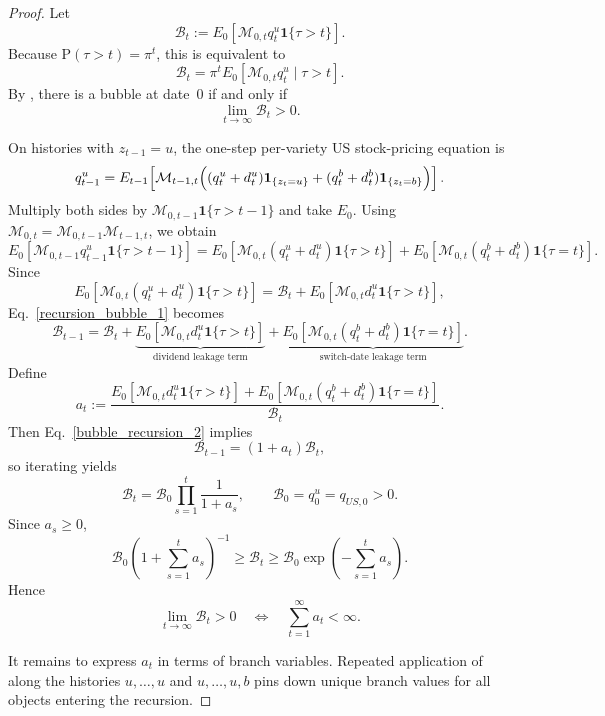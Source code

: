\documentclass{article}
\begin{document}
\begin{proof}
Let
\[
\mathcal B_t
:=
E_0\!\left[\mathcal M_{0,t}q_t^u\mathbf 1\{\tau>t\}\right].
\]
Because $\mathrm{P}(\tau>t)=\pi^t$, this is equivalent to
\[
\mathcal B_t
=
\pi^t E_0\!\left[\mathcal M_{0,t}q_t^u\mid \tau>t\right].
\]
By , there is a bubble at date~0 if and only if
\[
\lim_{t\to\infty}\mathcal B_t>0.
\]

On histories with $z_{t-1}=u$, the one-step per-variety US stock-pricing equation is
\[
q_{t-1}^u
=
E_{t-1}\!\left[\mathcal M_{t-1,t}
\Bigl(
(q_t^u+d_t^u)\mathbf 1_{\{z_t=u\}}
+
(q_t^b+d_t^b)\mathbf 1_{\{z_t=b\}}
\Bigr)\right].
\]
Multiply both sides by $\mathcal M_{0,t-1}\mathbf 1\{\tau>t-1\}$ and take $E_0$. Using $\mathcal M_{0,t}=\mathcal M_{0,t-1}\mathcal M_{t-1,t}$, we obtain
\begin{equation}\label{recursion_bubble_1}
E_0\!\left[\mathcal M_{0,t-1}q_{t-1}^u\mathbf 1\{\tau>t-1\}\right]
=
E_0\!\left[\mathcal M_{0,t}(q_t^u+d_t^u)\mathbf 1\{\tau>t\}\right]
+
E_0\!\left[\mathcal M_{0,t}(q_t^b+d_t^b)\mathbf 1\{\tau=t\}\right].
\end{equation}
Since
\[
E_0\!\left[\mathcal M_{0,t}(q_t^u+d_t^u)\mathbf 1\{\tau>t\}\right]
=
\mathcal B_t
+
E_0\!\left[\mathcal M_{0,t}d_t^u\mathbf 1\{\tau>t\}\right],
\]
Eq.~\eqref{recursion_bubble_1} becomes
\begin{equation}\label{bubble_recursion_2}
\mathcal B_{t-1}
=
\mathcal B_t
+
\underbrace{E_0\!\left[\mathcal M_{0,t}d_t^u\mathbf 1\{\tau>t\}\right]}_{\text{dividend leakage term}}
+
\underbrace{E_0\!\left[\mathcal M_{0,t}(q_t^b+d_t^b)\mathbf 1\{\tau=t\}\right]}_{\text{switch-date leakage term}}.
\end{equation}
Define
\[
a_t
:=
\frac{
E_0\!\left[\mathcal M_{0,t}d_t^u\mathbf 1\{\tau>t\}\right]
+
E_0\!\left[\mathcal M_{0,t}(q_t^b+d_t^b)\mathbf 1\{\tau=t\}\right]
}{
\mathcal B_t
}.
\]
Then Eq.~\eqref{bubble_recursion_2} implies
\[
\mathcal B_{t-1}=(1+a_t)\mathcal B_t,
\]
so iterating yields
\[
\mathcal B_t
=
\mathcal B_0\prod_{s=1}^t\frac{1}{1+a_s},
\qquad
\mathcal B_0=q_0^u=q_{US,0}>0.
\]
Since $a_s\ge 0$,
\[
\mathcal B_0\left(1+\sum_{s=1}^t a_s\right)^{-1}
\ge
\mathcal B_t
\ge
\mathcal B_0\exp\!\left(-\sum_{s=1}^t a_s\right).
\]
Hence
\[
\lim_{t\to\infty}\mathcal B_t>0
\quad\Longleftrightarrow\quad
\sum_{t=1}^\infty a_t<\infty.
\]

It remains to express $a_t$ in terms of branch variables. Repeated application of  along the histories $u,\ldots,u$ and $u,\ldots,u,b$ pins down unique branch values for all objects entering the recursion.


\end{proof}
\end{document}
